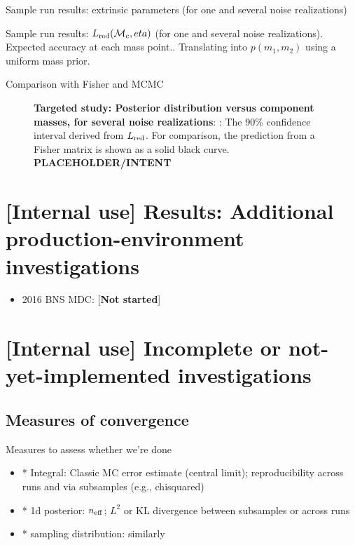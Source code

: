 \documentclass[twocolumn,prd,nofootinbib]{revtex4}
\newcommand\mc{{{\cal M}_c}}
\begin{document}
{Sample run results: extrinsic parameters (for one and several noise realizations)

Sample run results: $L_{\rm red}(\mc,eta)$ (for one and several noise realizations). Expected accuracy at each mass
point.. Translating into  $p(m_1,m_2)$ using a uniform mass prior.

Comparison with Fisher and MCMC


\begin{figure}
\caption{\label{fig:TargetedEvent:LikelihoodVersusMchirpEta}\textbf{Targeted study: Posterior distribution
    versus component masses, for several noise realizations}: : The 90\% confidence interval derived from $L_{\rm red}$.  For
comparison, the prediction from a Fisher matrix is shown as a solid black curve.
 \textbf{PLACEHOLDER/INTENT}
}
\end{figure}


\section{[Internal use] Results: Additional production-environment investigations}

\begin{itemize}
\item 2016 BNS MDC: [\textbf{Not started}]

\end{itemize}

\section{[Internal use] Incomplete or not-yet-implemented investigations}

\subsection{Measures of convergence}

Measures to assess whether we're done
\begin{itemize}
\item * Integral: Classic MC error estimate (central limit); reproducibility across runs and via subsamples (e.g., chisquared)

\item * 1d posterior:  $n_{\rm eff}$; $L^2$ or KL divergence between subsamples or across runs

\item * sampling distribution: similarly
\end{itemize}


}
\end{document}

